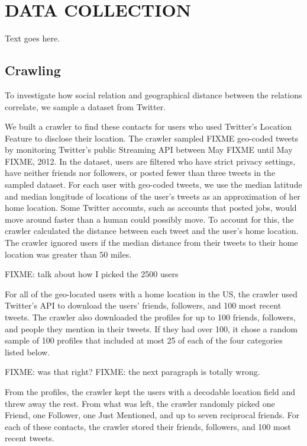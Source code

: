 \chapter{\uppercase {Data Collection}}

Text goes here.

\section{Crawling}
To investigate how social relation and geographical distance between the
relations correlate, we sample a dataset from Twitter.

We built a crawler to find these contacts for users who used Twitter's Location
Feature to disclose their location.
The crawler sampled FIXME geo-coded tweets by monitoring Twitter's public
Streaming API between May FIXME until May FIXME, 2012.
In the dataset, users are filtered who have strict privacy settings, have
neither friends nor followers, or posted fewer than three tweets in the sampled
dataset.
For each user with geo-coded tweets, we use the median latitude and median
longitude of locations of the user's tweets as an approximation of her home
location.
Some Twitter accounts, such as accounts that posted jobs, would
move around faster than a human could possibly move.
To account for this, the crawler calculated the distance between each tweet and
the user's home location.
The crawler ignored users if the median distance from their tweets to their
home location was greater than 50 miles.

FIXME: talk about how I picked the 2500 users

For all of the geo-located users with a home location in the US, the crawler
used Twitter's API to download the users' friends, followers, and 100 most
recent tweets.
The crawler also downloaded the profiles for up to 100 friends, followers, and
people they mention in their tweets. If they had over 100, it chose a random
sample of 100 profiles that included at most 25 of each of the four
categories listed below.

FIXME: was that right?
FIXME: the next paragraph is totally wrong.

From the profiles, the crawler kept the users with a decodable location field
and threw away the rest.
From what was left, the crawler randomly picked one
Friend, one Follower, one Just Mentioned, and up to seven reciprocal friends.
For each of these contacts, the crawler stored their friends, followers, and
100 most recent tweets.

